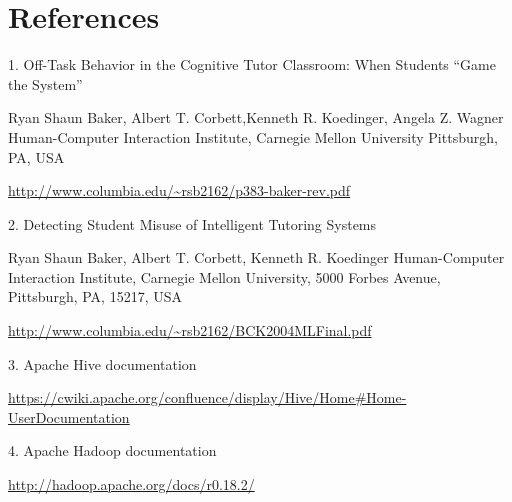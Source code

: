 \documentclass[a4paper,12pt,oneside]{sphinxmanual}
\begin{document}
\chapter{References}
\label{references:references}
\begin{DUlineblock}{0em}
\item[] 1. Off-Task Behavior in the Cognitive Tutor Classroom: When Students “Game the System”
\item[]
\begin{DUlineblock}{\DUlineblockindent}
\item[] Ryan Shaun Baker, Albert T. Corbett,Kenneth R. Koedinger, Angela Z. Wagner Human-Computer Interaction Institute, Carnegie Mellon University Pittsburgh, PA, USA
\item[] \href{http://www.columbia.edu/~rsb2162/p383-baker-rev.pdf}{http://www.columbia.edu/\textasciitilde{}rsb2162/p383-baker-rev.pdf}
\end{DUlineblock}
\end{DUlineblock}

\begin{DUlineblock}{0em}
\item[] 2. Detecting Student Misuse of Intelligent Tutoring Systems
\item[]
\begin{DUlineblock}{\DUlineblockindent}
\item[] Ryan Shaun Baker, Albert T. Corbett, Kenneth R. Koedinger Human-Computer Interaction Institute, Carnegie Mellon University, 5000 Forbes Avenue, Pittsburgh, PA, 15217, USA
\item[] \href{http://www.columbia.edu/~rsb2162/BCK2004MLFinal.pdf}{http://www.columbia.edu/\textasciitilde{}rsb2162/BCK2004MLFinal.pdf}
\end{DUlineblock}
\end{DUlineblock}

\begin{DUlineblock}{0em}
\item[] 3. Apache Hive documentation
\item[]
\begin{DUlineblock}{\DUlineblockindent}
\item[] \href{https://cwiki.apache.org/confluence/display/Hive/Home\#Home-UserDocumentation}{https://cwiki.apache.org/confluence/display/Hive/Home\#Home-UserDocumentation}
\end{DUlineblock}
\end{DUlineblock}

\begin{DUlineblock}{0em}
\item[] 4. Apache Hadoop documentation
\item[]
\begin{DUlineblock}{\DUlineblockindent}
\item[] \href{http://hadoop.apache.org/docs/r0.18.2/}{http://hadoop.apache.org/docs/r0.18.2/}
\end{DUlineblock}
\end{DUlineblock}
\end{document}
